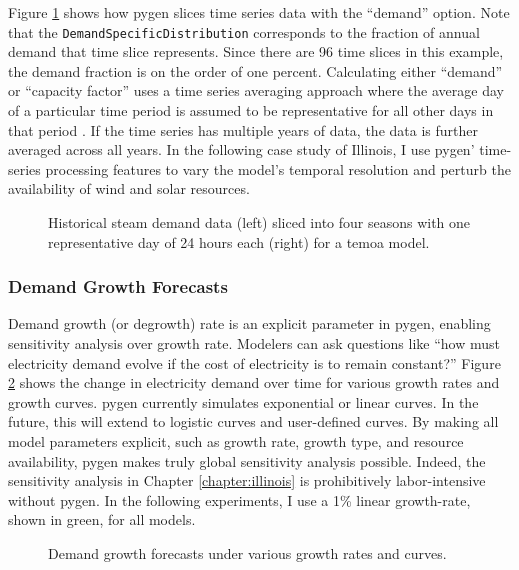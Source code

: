 Figure \ref{fig:steam-timeslice} shows how \gls{pygen} slices time series
data with the ``demand'' option. Note that the \texttt{DemandSpecificDistribution}
corresponds to the fraction of annual demand that time slice represents. Since
there are 96 time slices in this example, the demand fraction is on the order of one
percent. Calculating either ``demand'' or ``capacity factor'' uses a time series
averaging approach where the average day of a particular time period is assumed
to be representative for all other days in that period \cite{kotzur_impact_2018}.
If the time series has multiple years of data, the data is further averaged
across all years. In the following case study of Illinois, I use \gls{pygen}'
time-series processing features to vary the model's temporal resolution and perturb
the availability of wind and solar resources.

\begin{figure}[H]
  \resizebox{\textwidth}{!}{}
  \caption{Historical steam demand data (left) sliced into four seasons with one
  representative day of 24 hours each (right) for a \gls{temoa} model.}
  \label{fig:steam-timeslice}
\end{figure}

\subsubsection{Demand Growth Forecasts}
Demand growth (or degrowth) rate is an explicit parameter in \gls{pygen}, enabling
sensitivity analysis over growth rate. Modelers can ask questions like
``how must electricity demand evolve if the cost of electricity is to remain
constant?'' Figure \ref{fig:dem-growth} shows the change in electricity demand
over time for various growth rates and growth curves. \gls{pygen} currently simulates
exponential or linear curves. In the future, this will extend to logistic curves
and user-defined curves. By making all model parameters explicit, such as growth
rate, growth type, and resource availability, \gls{pygen} makes truly global sensitivity
analysis possible. Indeed, the sensitivity analysis in Chapter \ref{chapter:illinois}
is prohibitively labor-intensive without \gls{pygen}. In the following experiments,
I use a 1\% linear growth-rate, shown in green, for all models.

\begin{figure}[H]
  \centering
  \resizebox{0.8\textwidth}{!}{}
  \caption{Demand growth forecasts under various growth rates and curves.}
  \label{fig:dem-growth}
\end{figure}
